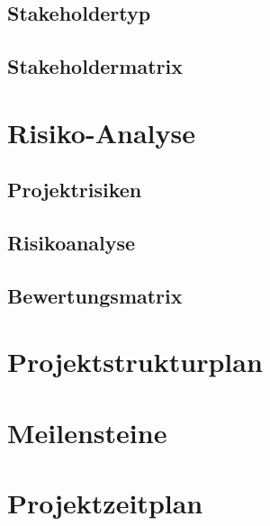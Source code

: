 \subsection{Stakeholdertyp}\label{subsec:stakeholdertyp}


\subsection{Stakeholdermatrix}\label{subsec:stakeholdermatrix}


\section{Risiko-Analyse}\label{sec:risiko_analyse}


\subsection{Projektrisiken}


\subsection{Risikoanalyse}


\subsection{Bewertungsmatrix}\label{subsec:bewertungsmatrix}


\section{Projektstrukturplan}\label{sec:projektstrukturplan}


\section{Meilensteine}\label{sec:meilensteine}


\section{Projektzeitplan}\label{sec:projektzeitplan}


